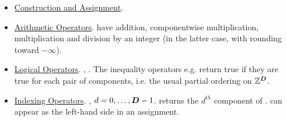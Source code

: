 \documentclass[12pt]{article}
\begin{document}
\begin{itemize}
\item
\underline{Construction and Assignment}. 
\item
\underline{Arithmetic Operators}. 
 have addition, componentwise multiplication, multiplication and division by an integer (in the latter case, with rounding toward $-\infty$).
\item
\underline{Logical Operators}.
, . The inequality operators e.g.  return true if they are true for each pair of components, i.e. the usual partial ordering on $\mathbb{Z}^{\boldsymbol{D}}$.
\item
\underline{Indexing Operators}.
, $d = 0, \dots , {\boldsymbol{D}}-1 $. returns the $d^{th}$ component of .  can appear as the left-hand side in an assignment.
\end{itemize}
%
%
%
%

\subsection{}
\end{document}
